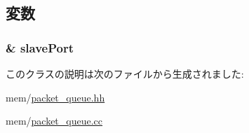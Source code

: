 \subsection{変数}
\hypertarget{classSlavePacketQueue_af8e5dfce1f3b07a01c692d32d655bcf6}{
\subsubsection[{slavePort}]{\& {\bf slavePort}}}
\label{classSlavePacketQueue_af8e5dfce1f3b07a01c692d32d655bcf6}


このクラスの説明は次のファイルから生成されました:\begin{DoxyCompactItemize}
\item 
mem/\hyperlink{packet__queue_8hh}{packet\_\-queue.hh}\item 
mem/\hyperlink{packet__queue_8cc}{packet\_\-queue.cc}\end{DoxyCompactItemize}
